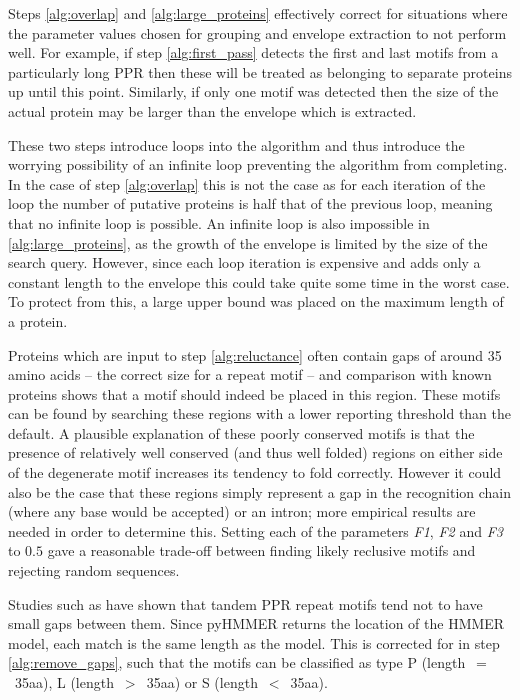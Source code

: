 Steps \ref{alg:overlap} and \ref{alg:large_proteins} effectively correct for
situations where the parameter values chosen for grouping and envelope
extraction to not perform well.
For example, if step \ref{alg:first_pass} detects the first and last motifs
from a particularly long PPR then these will be treated as belonging to 
separate proteins up until this point.
Similarly, if only one motif was detected then the size of the actual protein
may be larger than the envelope which is extracted.

These two steps introduce loops into the algorithm and thus introduce the
worrying possibility of an infinite loop preventing the algorithm from
completing.
In the case of step \ref{alg:overlap} this is not the case as for each
iteration of the loop the number of putative proteins is half that of the
previous loop, meaning that no infinite loop is possible.
An infinite loop is also impossible in \ref{alg:large_proteins}, as the growth
of the envelope is limited by the size of the search query. 
However, since each loop iteration is expensive and adds only a constant 
length to the envelope this could take quite some time in the worst case.
To protect from this, a large upper bound was placed on the maximum length of 
a protein.

Proteins which are input to step \ref{alg:reluctance} often contain gaps of
around 35 amino acids -- the correct size for a repeat motif -- and comparison
with known proteins shows that a motif should indeed be placed in this region.
These motifs can be found by searching these regions with a lower reporting
threshold than the default.
A plausible explanation of these poorly conserved motifs is that the presence of
relatively well conserved (and thus well folded) regions on either side of the
degenerate motif increases its tendency to fold correctly.
However it could also be the case that these regions simply represent a gap in
the recognition chain (where any base would be accepted) or an intron; more
empirical results are needed in order to determine this.
Setting each of the parameters \emph{F1}, \emph{F2} and \emph{F3} to $0.5$ 
gave a reasonable trade-off between finding likely reclusive motifs and 
rejecting random sequences.

Studies such as \citet{Lurin2004} have shown that tandem PPR repeat motifs tend
not to have small gaps between them.
Since pyHMMER returns the location of the HMMER model, each match is the same
length as the model.
This is corrected for in step \ref{alg:remove_gaps}, such that the motifs can
be classified as type P (length~$=$~35aa), L (length~$>$~35aa) or 
S (length~$<$~35aa).

